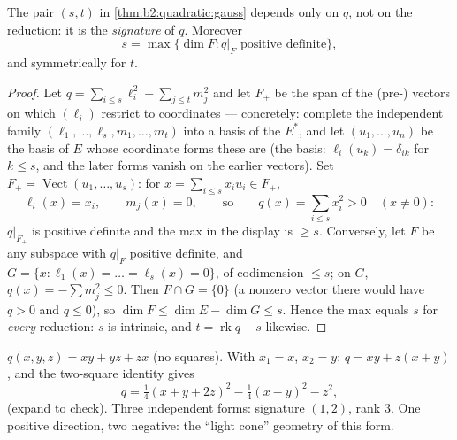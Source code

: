 \begin{theorem}\label{thm:b2:quadratic:sylvester}
The pair $(s, t)$ in \cref{thm:b2:quadratic:gauss} depends only on
$q$, not on the reduction: it is the
\emph{signature} of $q$.
Moreover
\[
s = \max\{\dim F : q|_F \text{ positive definite}\},
\]
and symmetrically for $t$.
\end{theorem}

\begin{proof}
Let $q = \sum_{i \leq s}\ell_i^2 - \sum_{j\leq t} m_j^2$ and let
$F_+$ be the span of the (pre-) vectors on which $(\ell_i)$
restrict to coordinates --- concretely: complete the
independent family $(\ell_1, \dots, \ell_s, m_1, \dots, m_t)$
into a basis of the  $E^*$, and let $(u_1, \dots, u_n)$ be
the basis of $E$ whose coordinate forms these are (the
 basis: $\ell_i(u_k) = \delta_{ik}$ for $k \leq s$,
and the later forms vanish on the earlier vectors). Set $F_+ =
\operatorname{Vect}(u_1, \dots, u_s)$: for $x = \sum_{i\leq
s}x_iu_i \in F_+$,
\[
\ell_i(x) = x_i,
\qquad m_j(x) = 0,
\qquad\text{so}\qquad
q(x) = \sum_{i\leq s}x_i^2 > 0 \quad (x \neq 0) :
\]
$q|_{F_+}$ is positive definite and the max in the display
is $\geq s$. Conversely, let $F$ be any subspace with $q|_F$
positive definite, and $G = \{x : \ell_1(x) = \dots = \ell_s(x) =
0\}$, of codimension $\leq s$; on $G$, $q(x) = -\sum m_j^2 \leq 0$.
Then $F \cap G = \{0\}$ (a nonzero vector there would have $q > 0$
and $q \leq 0$), so $\dim F \leq \dim E - \dim G \leq s$. Hence the
max equals $s$ for \emph{every} reduction: $s$ is intrinsic, and $t
= \operatorname{rk} q - s$ likewise.
\end{proof}

\begin{example}\label{ex:b2:quadratic:gaussexample}
$q(x, y, z) = xy + yz + zx$ (no squares). With $x_1 = x$, $x_2 =
y$: $q = xy + z(x + y)$, and the two-square identity gives
\[
q = \tfrac14(x + y + 2z)^2 - \tfrac14(x - y)^2 - z^2 ,
\]
(expand to check). Three independent forms: signature $(1, 2)$,
rank $3$. One positive direction, two negative: the ``light cone''
geometry of this form.
\end{example}

